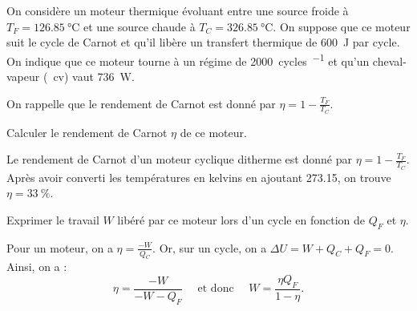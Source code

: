 \debutEntrainement

On considère un moteur thermique évoluant entre une source froide à $T_F=\SI{126,85}{\celsius}$ et une source chaude à $T_C=\SI{326,85}{\celsius}$. On suppose que ce moteur suit le cycle de Carnot et qu'il libère un transfert thermique de \SI{600}{\joule} par cycle. 
On indique que ce moteur tourne à un régime de \SI{2000}{cycles\per\min} et qu'un cheval-vapeur (\SI{}{cv}) vaut \SI{736}{\watt}. 

On rappelle que le rendement de Carnot est donné par $\eta=1-\frac{T_F}{T_C}$.


\minusMedskip


\begin{enonce}
	Calculer le rendement de Carnot $\eta$ de ce moteur.
\end{enonce}


\begin{corrige}
Le rendement de Carnot d'un moteur cyclique ditherme est donné par $\eta=1-\frac{T_F}{T_C}$. Après avoir converti les températures en kelvins en ajoutant \SI{273,15}{}, on trouve $\eta=\SI{33}{\%}$.
\end{corrige}



\begin{enonce}
	Exprimer le travail $W$ libéré par ce moteur lors d'un cycle en fonction de $Q_F$ et $\eta$.
	
\end{enonce}


\begin{corrige}
Pour un moteur, on a $\eta=\frac{-W}{Q_C}$. Or, sur un cycle, on a $\Delta U=W+Q_C+Q_F=0$. Ainsi, on a : 
\[
\eta=\frac{-W}{-W-Q_F}
\quad\text{ et donc }\quad
W=\frac{\eta Q_F}{1-\eta}.
\]
\end{corrige}



